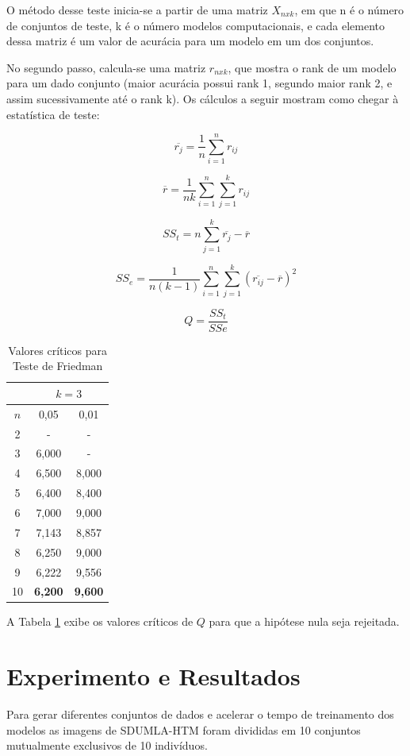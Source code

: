 \documentclass[conference]{IEEEtran}
\begin{document}
O método desse teste inicia-se a partir de uma matriz $X_{nxk}$, em que n é o número de conjuntos de teste, k é o número modelos computacionais, e cada elemento dessa matriz é um valor de acurácia para um modelo em um dos conjuntos. 

No segundo passo, calcula-se uma matriz $r_{nxk}$, que mostra o rank de um modelo para um dado conjunto (maior acurácia possui rank 1, segundo maior rank 2, e assim sucessivamente até o rank k). Os cálculos a seguir mostram como chegar à estatística de teste:

\[\overline{r_j} = \frac{1}{n} \sum_{i=1}^{n} r_{ij}\]

\[\overline{r} = \frac{1}{nk} \sum_{i=1}^{n} \sum_{j=1}^{k} r_{ij}\]

\[SS_t = n \sum_{j=1}^{k} \overline{r_j} - \overline{r}\]

\[SS_e = \frac{1}{n(k-1)} \sum_{i=1}^{n} \sum_{j=1}^{k} (\overline{r_{ij}} - \overline{r})^2\]

\[Q = \frac{SS_t}{SSe}\]

\begin{table}[!t]
\caption{Valores críticos para Teste de Friedman}
\label{table_friedman_values}
\centering
\begin{tabular}{|c|c|c|} \hline
& \multicolumn{2}{c|}{$k=3$} \\ \hline 
$n$&  0,05          &  0,01          \\ \hline
 2 &   -            &   -            \\
 3 & 6,000          &   -            \\
 4 & 6,500          & 8,000          \\
 5 & 6,400          & 8,400          \\
 6 & 7,000          & 9,000          \\
 7 & 7,143          & 8,857          \\
 8 & 6,250          & 9,000          \\
 9 & 6,222          & 9,556          \\
10 & \textbf{6,200} & \textbf{9,600} \\ \hline
\end{tabular}
\end{table}

A Tabela \ref{table_friedman_values} exibe os valores críticos de $Q$ para que a hipótese nula seja rejeitada.

\section{Experimento e Resultados} \label{sec:resultados}
Para gerar diferentes conjuntos de dados e acelerar o tempo de treinamento dos modelos as imagens de SDUMLA-HTM foram divididas em 10 conjuntos mutualmente exclusivos de 10 indivíduos.
\end{document}
